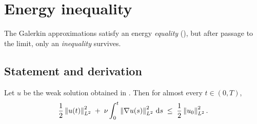 \section{Energy inequality}\label{sec:energy-inequality}

The Galerkin approximations satisfy an energy \emph{equality}
(), but after passage to the limit, only an
\emph{inequality} survives.

\subsection{Statement and derivation}

\begin{theorem}%
  \label{thm:energy-inequality}
  Let $u$ be the weak solution obtained in .  Then for
  almost every $t \in (0, T)$,
  \begin{equation}\label{eq:energy-inequality}
    \frac{1}{2}\left\lVert u(t) \right\rVert_{L^{2}}^{2}
    \;+\;
    \nu \int_{0}^{t} \left\lVert \nabla u(s) \right\rVert_{L^{2}}^{2} \,\mathrm{d} s
    \;\le\;
    \frac{1}{2}\left\lVert u_{0} \right\rVert_{L^{2}}^{2}.
  \end{equation}
\end{theorem}

